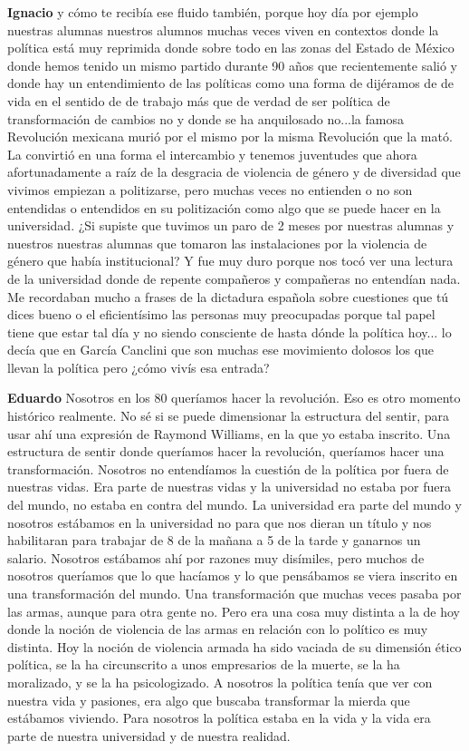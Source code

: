 \documentclass[
  spanish,
  11pt,
  a4paper,
]{scrbook}
\newenvironment{transcripcion}{
    \begin{list}{}{
        \setlength{\leftmargin}{1.5em}  %
        \setlength{\rightmargin}{0em}
        \setlength{\itemsep}{0.2em}     %
        \setlength{\parsep}{0.0em}
        \setlength{\listparindent}{0pt}
    }
}{
    \end{list}
}
\newcommand{\personaje}[1]{\textbf{#1}\quad}
\begin{document}
\begin{transcripcion}
\item \personaje{Ignacio} y cómo te recibía ese fluido también, porque hoy día por ejemplo nuestras alumnas nuestros alumnos muchas veces viven en contextos donde la política está muy reprimida donde sobre todo en las zonas del Estado de México donde hemos tenido un mismo partido durante 90 años que recientemente salió y donde hay un entendimiento de las políticas como una forma de dijéramos de de vida en el sentido de de trabajo más que de verdad de ser política de transformación de cambios no y donde se ha anquilosado no...la famosa Revolución mexicana murió por el mismo por la misma Revolución que la mató. La convirtió en una forma el intercambio y tenemos juventudes que ahora afortunadamente a raíz de la desgracia de violencia de género y de diversidad que vivimos empiezan a politizarse, pero muchas veces no entienden o no son entendidas o entendidos en su politización como algo que se puede hacer en la universidad. ¿Si supiste que tuvimos un paro de 2 meses por nuestras alumnas y nuestros nuestras alumnas que tomaron las instalaciones por la violencia de género que había institucional? Y fue muy duro porque nos tocó ver una lectura de la universidad donde de repente compañeros y compañeras no entendían nada. Me recordaban mucho a frases de la dictadura española sobre cuestiones que tú dices bueno o el eficientísimo las personas muy preocupadas porque tal papel tiene que estar tal día y no siendo consciente de hasta dónde la política hoy... lo decía que en García Canclini que son muchas ese movimiento dolosos los que llevan la política pero ¿cómo vivís esa entrada?

\item \personaje{Eduardo} Nosotros en los 80 queríamos hacer la revolución. Eso es otro momento histórico realmente. No sé si se puede dimensionar la estructura del sentir, para usar ahí una expresión de Raymond Williams, en la que yo estaba inscrito. Una estructura de sentir donde queríamos hacer la revolución, queríamos hacer una transformación. Nosotros no entendíamos la cuestión de la política por fuera de nuestras vidas. Era parte de nuestras vidas y la universidad no estaba por fuera del mundo, no estaba en contra del mundo. La universidad era parte del mundo y nosotros estábamos en la universidad no para que nos dieran un título y nos habilitaran para trabajar de 8 de la mañana a 5 de la tarde y ganarnos un salario. Nosotros estábamos ahí por razones muy disímiles, pero muchos de nosotros queríamos que lo que hacíamos y lo que pensábamos se viera inscrito en una transformación del mundo. Una transformación que muchas veces pasaba por las armas, aunque para otra gente no. Pero era una cosa muy distinta a la de hoy donde la noción de violencia de las armas en relación con lo político es muy distinta. Hoy la noción de violencia armada ha sido vaciada de su dimensión ético política, se la ha circunscrito a unos empresarios de la muerte, se la ha moralizado, y se la ha psicologizado. A nosotros la política tenía que ver con nuestra vida y pasiones, era algo que buscaba transformar la mierda que estábamos viviendo. Para nosotros la política estaba en la vida y la vida era parte de nuestra universidad y de nuestra realidad.


\end{transcripcion}
\end{document}
